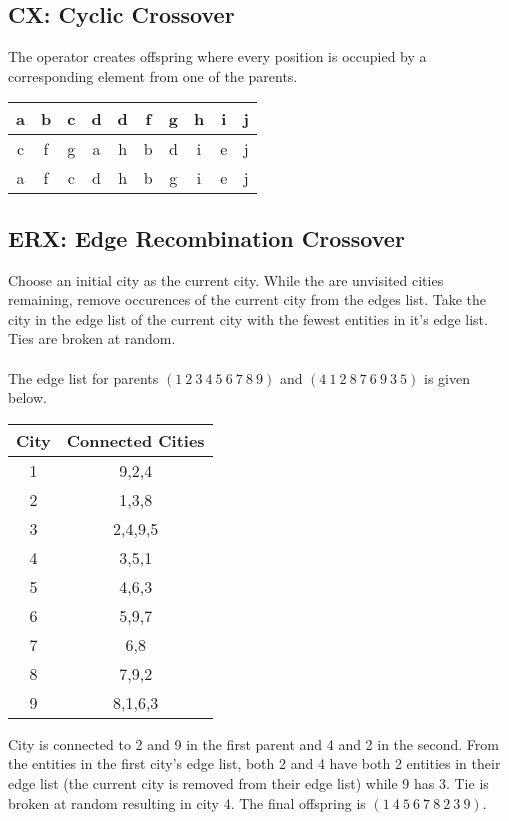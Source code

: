 \documentclass[../main.tex]{subfiles}
\begin{document}
\subsection{CX: Cyclic Crossover}
The operator creates offspring where every position is occupied by a corresponding element from one of the parents.
\begin{table}[H]
    \centering
    \begin{tabular}{|c|c|c|c|c|c|c|c|c|c|}
        \hline
        \cellcolor{black!25}a & b & \cellcolor{black!10}c & \cellcolor{black!10}d & d & f & \cellcolor{black!10}g & h & i & j \\ \hline
        \cellcolor{black!10}c & f & \cellcolor{black!10}g & a & h & b & \cellcolor{black!10}d & i & e & j \\ \hline
        \hline
        \cellcolor{black!10}a & f & \cellcolor{black!10}c & \cellcolor{black!10}d & h & b & \cellcolor{black!10}g & i & e & j \\ \hline
    \end{tabular}
\end{table}

\subsection{ERX: Edge Recombination Crossover}
Choose an initial city as the current city. While the are unvisited cities remaining, remove occurences of the current city from the edges list. Take the city in the edge list of the current city with the fewest entities in it's edge list. Ties are broken at random.
\\\\
The edge list for parents $(1 ~ 2 ~ 3 ~ 4 ~ 5 ~ 6 ~ 7 ~ 8 ~ 9)$ and $(4 ~ 1 ~ 2 ~ 8 ~ 7 ~ 6 ~ 9 ~ 3 ~ 5)$ is given below.

\begin{table}[H]
    \centering
    \begin{tabular}{cc}
    \toprule
    City & Connected Cities \\
    \midrule
    1 & 9,2,4 \\
    2 & 1,3,8 \\
    3 & 2,4,9,5 \\
    4 & 3,5,1 \\
    5 & 4,6,3 \\
    6 & 5,9,7 \\
    7 & 6,8 \\
    8 & 7,9,2 \\
    9 & 8,1,6,3 \\
    \bottomrule
    \end{tabular}
\end{table}
City is connected to 2 and 9 in the first parent and 4 and 2 in the second. From the entities in the first city's edge list, both 2 and 4 have both 2 entities in their edge list (the current city is removed from their edge list) while 9 has 3. Tie is broken at random resulting in city 4. The final offspring is $(1 ~ 4 ~5 ~6 ~7 ~8 ~2 ~3 ~9)$.
\end{document}
